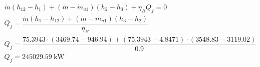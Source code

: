 \begin{math}
	\begin{array}{l}
		\dot m ( h_{12} - h_1 ) + (\dot m - \dot m_{u1})( h_2 - h_3 )
			+ \eta_B Q_f = 0 \\
		Q_f = \dfrac{\dot m ( h_1 - h_{12} )
				+ (\dot m - \dot m_{u1})( h_3 - h_2 )
			}{\eta_B} \\

		Q_f = \dfrac{\num{75,3943} \cdot (\num{3469,74} - \num{946,94})
				+ (\num{75,3943} - \num{4,8471})
					\cdot (\num{3548,83} - \num{3119,02})
			}{\num{0,9}} \\
		Q_f = \SI{245029,59}{\kilo\watt} \\
	\end{array}
\end{math}
